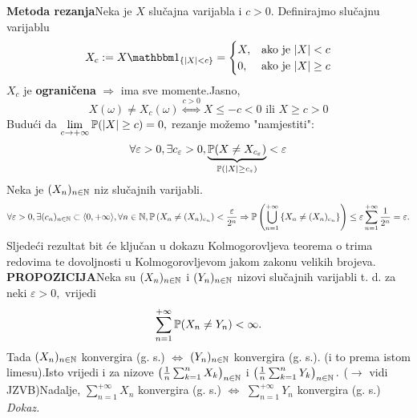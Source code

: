 \documentclass{article}
\begin{document}
\textbf{Metoda rezanja}\newline Neka je \(X\) slučajna varijabla i \(c>0.\) Definirajmo slučajnu varijablu \[X_c:=X\mathbbm 1_{\{|X|< c\}}=\begin{cases}X,&\text{ako je }|X|<c\\0,&\text{ako je }|X|\ge c\end{cases}\] \(X_c\) je \textbf{ograničena} \(\Rightarrow\) ima sve momente.\newline Jasno, \[X(\omega)\ne X_c(\omega)\overset{c>0}{\Leftrightarrow}X\le -c<0\text{ ili }X\ge c>0\]\newline Budući da \(\lim\limits_{c\to+\infty}\Bbb P(|X|\ge c)=0,\) rezanje možemo "namjestiti": \[\forall\varepsilon>0,\exists c_\varepsilon >0,\underbrace{\Bbb P(X\ne X_{c_\varepsilon})}_{\Bbb P(|X|\ge c_\varepsilon)}<\varepsilon\] Neka je \((X_n)_{n\in\Bbb N}\) niz slučajnih varijabli. \[\forall\varepsilon>0,\exists (c_n)_{n\in\Bbb N}\subset\langle 0,+\infty\rangle,\forall n\in\Bbb N,\Bbb P\left(X_n\ne (X_n)_{c_n}\right)<\frac\varepsilon{2^n}\Rightarrow\Bbb P\left(\bigcup_{n=1}^{+\infty}\left\{X_n\ne(X_n)_{ c_n}\right\}\right)\le\varepsilon\sum_{n=1}^{+\infty}\frac1{2^n}=\varepsilon.\]Sljedeći rezultat bit će ključan u dokazu Kolmogorovljeva teorema o trima redovima te dovoljnosti u Kolmogorovljevom jakom zakonu velikih brojeva.\newline\newline 
\textbf{PROPOZICIJA}\newline Neka su \((X_n)_{n\in\Bbb N}\) i \((Y_n)_{n\in\Bbb N}\) nizovi slučajnih varijabli t. d. za neki \(\varepsilon>0,\) vrijedi \[\sum_{n=1}^{+\infty}\Bbb P(X_n\ne Y_n)<\infty.\] Tada \((X_n)_{n\in\Bbb N}\) konvergira (g. s.) \(\Leftrightarrow\) \((Y_n)_{n\in\Bbb N}\) konvergira (g. s.). (i to prema istom limesu).\newline Isto vrijedi i za nizove \(\left(\frac1n\sum_{k=1}^nX_k\right)_{n\in\Bbb N}\) i \(\left(\frac1n\sum_{k=1}^nY_k\right)_{n\in\Bbb N}.\) (\(\rightarrow\) vidi JZVB)\newline Nadalje, \(\sum_{n=1}^{+\infty}X_n\) konvergira (g. s.) \(\Leftrightarrow\) \(\sum_{n=1}^{+\infty}Y_n\) konvergira (g. s.)\newline\newline
\textit{Dokaz.}
\end{document}
